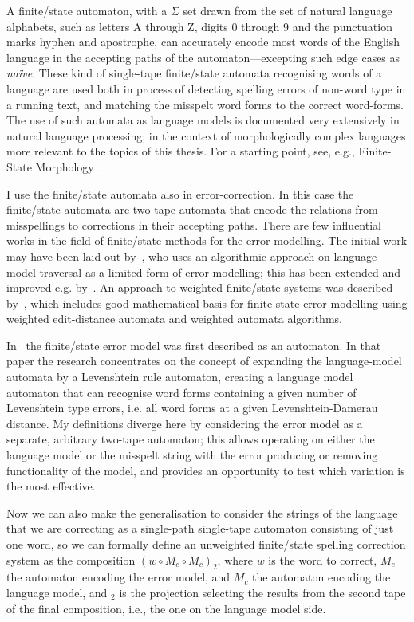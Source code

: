 \documentclass[officiallayout]{unihelcompling}
\begin{document}
A finite\-/state automaton, with a $\Sigma$ set drawn from the set of natural
language alphabets, such as letters A through Z, digits 0 through 9 and the
punctuation marks hyphen and apostrophe, can accurately encode most words of
the English language in the accepting paths of the automaton---excepting such
edge cases as \emph{naïve}. These kind of single-tape
finite\-/state automata recognising words of a language are used both in process
of detecting spelling errors of non-word type in a running text, and matching
the misspelt word forms to the correct word-forms. The use of such automata as
language models is documented very extensively in natural language processing;
in the context of morphologically complex languages more relevant to the topics of
this thesis. For a starting point, see, e.g., Finite-State Morphology~\citep{beesley2003finite,beesley2004morphological}.

I use the finite\-/state automata also in error-correction. In this case the
finite\-/state automata are two-tape automata that encode the relations from
misspellings to corrections in their accepting paths. There are few influential
works in the field of finite\-/state methods for the error modelling. The
initial work may have been laid out by~\citet{oflazer1996errortolerant}, who
uses an algorithmic approach on language model traversal as a limited form of
error modelling; this has been extended and improved e.g.
by~\citet{hulden2009fast}.  An approach to weighted finite\-/state systems was
described by~\citet{mohri2003edit}, which includes good mathematical basis for
finite-state error-modelling using weighted edit-distance automata and weighted
automata algorithms. 

In~\citet{agata2002typographical} the finite\-/state error model was first
described as an automaton. In that paper the research concentrates on the
concept of expanding the language-model automata by a Levenshtein rule
automaton, creating a language model automaton that can recognise word forms
containing a given number of Levenshtein type errors, i.e. all word forms at a
given Levenshtein-Damerau distance. My definitions diverge here by considering
the error model as a separate, arbitrary two-tape automaton; this allows
operating on either the language model or the misspelt string with the error
producing or removing functionality of the model, and provides an opportunity
to test which variation is the most effective. 

Now we can also make the generalisation to consider the strings of the language
that we are correcting as a single-path single-tape automaton consisting of
just one word, so we can formally define an unweighted finite\-/state spelling
correction system as the composition $(w \circ M_e \circ M_c)_2$, where $w$ is
the word to correct, $M_e$ the automaton encoding the error model, and $M_c$
the automaton encoding the language model, and $_2$ is the projection selecting
the results from the second tape of the final composition, i.e., the one on the
language model side.
\end{document}
